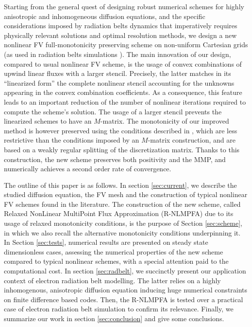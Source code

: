 \documentclass[final,11pt]{elsarticle}
\begin{document}
Starting from the general quest of designing robust numerical schemes for highly anisotropic and inhomogeneous diffusion equations, and the specific considerations imposed by radiation belts dynamics that imperatively requires physically relevant solutions and optimal resolution methods, we design a new nonlinear FV full-monotonicity preserving scheme on non-uniform Cartesian grids (as used in radiation belts simulations \cite{varotsou2008,subbotin2009,su2010}). The main innovation of our design, compared to usual nonlinear FV scheme, is the usage of convex combinations of upwind linear fluxes with a larger  stencil. Precisely, the latter matches in its ``linearized form'' the complete nonlinear stencil accounting for the unknowns appearing in the convex combination coefficients. As a consequence, this feature leads to an important reduction of the number of nonlinear iterations required to compute the scheme's solution. The usage of a larger stencil prevents the linearized schemes to have an $M$-matrix. The monotonicity of our improved method is however preserved using the conditions described in \cite{nordbotten2007}, which are less restrictive than the conditions imposed by an $M$-matrix construction, and are based on a weakly regular splitting of the discretization matrix. Thanks to this construction, the new scheme preserves both positivity and the MMP, and numerically achieves a second order rate of convergence.

The outline of this paper is as follows. In section \ref{sec:current}, we describe the studied diffusion equation, the FV mesh and the construction of typical nonlinear FV schemes found in the literature. The construction of the new scheme, called Relaxed NonLinear MultiPoint Flux Approximation (R-NLMPFA) due to its usage of relaxed monotonicity conditions, is the purpose of Section \ref{sec:scheme}, in which we also recall the alternative monotonicity conditions underpinning it. In Section \ref{sec:tests}, numerical results are presented on steady state dimensionless cases, assessing the numerical properties of the new scheme compared to typical nonlinear schemes, with a special attention paid to the computational cost. In section \ref{sec:radbelt}, we succinctly present our application context of electron radiation belt modelling. The latter relies on a highly inhomogenous, anisotropic diffusion equation inducing huge numerical constraints on finite difference based codes. Then, the R-NLMPFA is tested over a practical case of electron radiation belt simulation to confirm its relevance. Finally, we summarize our work in section \ref{sec:conclusion} and give some conclusions. 
\end{document}
